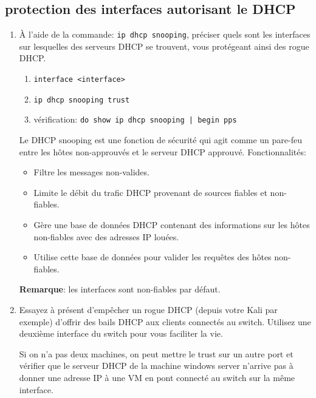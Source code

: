 \documentclass[a4paper]{article}
\begin{document}
\subsection{protection des interfaces autorisant le DHCP}





\begin{enumerate}

\item À l’aide de la commande: \texttt{ip dhcp snooping}, préciser quels sont les interfaces sur lesquelles des serveurs DHCP se trouvent, vous protégeant ainsi des rogue DHCP.
\begin{enumerate}
    \item \texttt{interface <interface>}
    \item \texttt{ip dhcp snooping trust}
    \item vérification: \texttt{do show ip dhcp snooping | begin pps}
\end{enumerate}
\begin{example}
    Le DHCP snooping est une fonction de sécurité qui agit comme un pare-feu entre les hôtes non-approuvés et le serveur DHCP approuvé.
    Fonctionnalités:
    \begin{itemize}
        \item Filtre les messages non-valides.
        \item Limite le débit du trafic DHCP provenant de sources fiables et non-fiables.
        \item Gère une base de données DHCP contenant des informations sur les hôtes non-fiables avec des adresses IP louées.
        \item Utilise cette base de données pour valider les requêtes des hôtes non-fiables.
    \end{itemize}
    \textbf{Remarque}: les interfaces sont non-fiables par défaut.
\end{example}

\item Essayez à présent d’empêcher un rogue DHCP (depuis votre Kali par exemple) d’offrir des bails DHCP aux clients connectés au switch. Utilisez une deuxième interface du switch pour vous faciliter la vie.
\begin{example}
    Si on n'a pas deux machines, on peut mettre le trust sur un autre port et vérifier que le serveur DHCP de la machine windows server n'arrive pas à donner une adresse IP à une VM en pont connecté au switch sur la même interface.
\end{example}

\end{enumerate}
\end{document}
